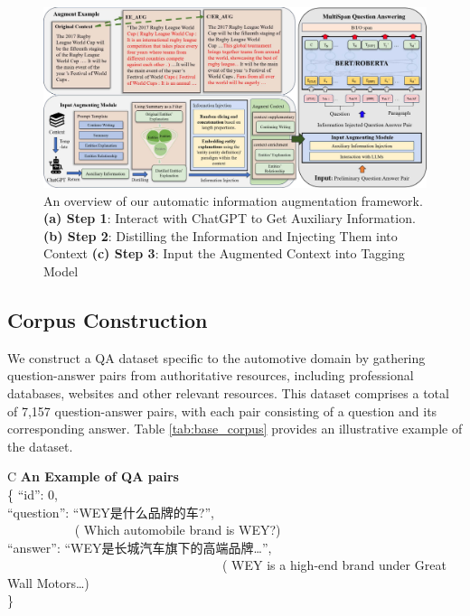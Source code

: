 \documentclass[mathematics,article,submit,moreauthors]{Definitions/mdpi}
\newcommand{\1}[1]{\mathds{1}\left[#1\right]}
\newcommand{\tableref}[1]{Table \ref{#1}}
\begin{document}
\begin{figure}[H]
	\includegraphics[width=14.0cm]{overview}
	\caption{An overview of our automatic information augmentation framework. \textbf{(a) Step 1}: Interact with ChatGPT to Get Auxiliary Information. \textbf{(b) Step 2}: Distilling the Information and Injecting Them into Context \textbf{(c) Step 3}: Input the Augmented Context into Tagging Model}
	\label{fig:overview}
\end{figure}   
\unskip


\subsection{Corpus Construction}
\label{sec:corpus_construction}
We construct a QA dataset specific to the automotive domain by gathering question-answer pairs from authoritative resources, including professional databases, websites and other relevant resources. This dataset comprises a total of 7,157 question-answer pairs, with each pair consisting of a question and its corresponding answer. \tableref{tab:base_corpus} provides an illustrative example of the dataset. 

\begin{table}[H] 
	\caption{The constructed Chinese QA corpus in automotive domain.} \label{tab:base_corpus}
	\begin{tabularx}{\textwidth}{C}
		\toprule
		\textbf{An Example of QA pairs}	\\
		\midrule
		\{ ``id'': 0,~~~~~~~~~~~~~~~~~~~~~~~~~~~~~~~~~~~~~~~~~~~~~~~~~~~~~~~~~~~~~~~~ \\
		``question'': ``WEY是什么品牌的车?'',~~~~~~~~~~~~~~~~~~~~~~ \\
		~~~~~~~~~~ ({\color{blue} Which automobile brand is WEY?}) \\ 
		``answer'': ``WEY是长城汽车旗下的高端品牌…'', ~~~~~~~\\
		 ~~~~~~~~~~~~~~~~~~~~~~~~~~~~~~~~~~({\color{blue} WEY is a high-end brand under Great Wall Motors…}) \\
		\}~~~~~~~~~~~~~~~~~~~~~~~~~~~~~~~~~~~~~~~~~~~~~~~~~~~~~~~~~~~~~~~~~~~~~~~~~\\
		\bottomrule
	\end{tabularx}
\end{table}
\end{document}
